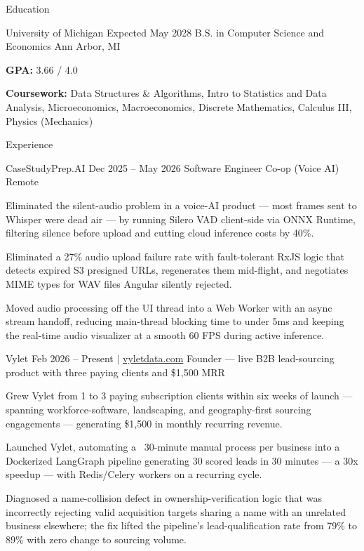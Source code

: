 \documentclass[
	11pt
]{../../../template}
\begin{document}
	\begin{rSection}{E}{ducation}
		\begin{rSectionEntry}
			{University of Michigan}
			{Expected May 2028}
			{B.S. in Computer Science and Economics}
			{}
			{Ann Arbor, MI}

			\item \textbf{GPA:} 3.66 / 4.0
			\item \textbf{Coursework:} Data Structures \& Algorithms, Intro to Statistics and Data Analysis, Microeconomics, Macroeconomics, Discrete Mathematics, Calculus III, Physics (Mechanics)
		\end{rSectionEntry}
	\end{rSection}

	\begin{rSection}{E}{xperience}
		\begin{rSectionEntry}
			{CaseStudyPrep.AI}
			{Dec 2025 -- May 2026}
			{Software Engineer Co-op (Voice AI)}
			{}
			{Remote}

			\item Eliminated the silent-audio problem in a voice-AI product --- most frames sent to Whisper were dead air --- by running Silero VAD client-side via ONNX Runtime, filtering silence before upload and cutting cloud inference costs by 40\%.
			\item Eliminated a 27\% audio upload failure rate with fault-tolerant RxJS logic that detects expired S3 presigned URLs, regenerates them mid-flight, and negotiates MIME types for WAV files Angular silently rejected.
			\item Moved audio processing off the UI thread into a Web Worker with an async stream handoff, reducing main-thread blocking time to under 5ms and keeping the real-time audio visualizer at a smooth 60 FPS during active inference.
		\end{rSectionEntry}

		\begin{rSectionEntry}
			{Vylet}
			{Feb 2026 -- Present $\vert$ \href{https://vyletdata.com}{vyletdata.com}}
			{Founder --- live B2B lead-sourcing product with three paying clients and \$1,500 MRR}
			{}
			{}

			\item Grew Vylet from 1 to 3 paying subscription clients within six weeks of launch --- spanning workforce-software, landscaping, and geography-first sourcing engagements --- generating \$1,500 in monthly recurring revenue.
			\item Launched Vylet, automating a ~30-minute manual process per business into a Dockerized LangGraph pipeline generating 30 scored leads in 30 minutes --- a 30x speedup --- with Redis/Celery workers on a recurring cycle.
			\item Diagnosed a name-collision defect in ownership-verification logic that was incorrectly rejecting valid acquisition targets sharing a name with an unrelated business elsewhere; the fix lifted the pipeline's lead-qualification rate from 79\% to 89\% with zero change to sourcing volume.
		\end{rSectionEntry}


\end{rSection}
\end{document}
